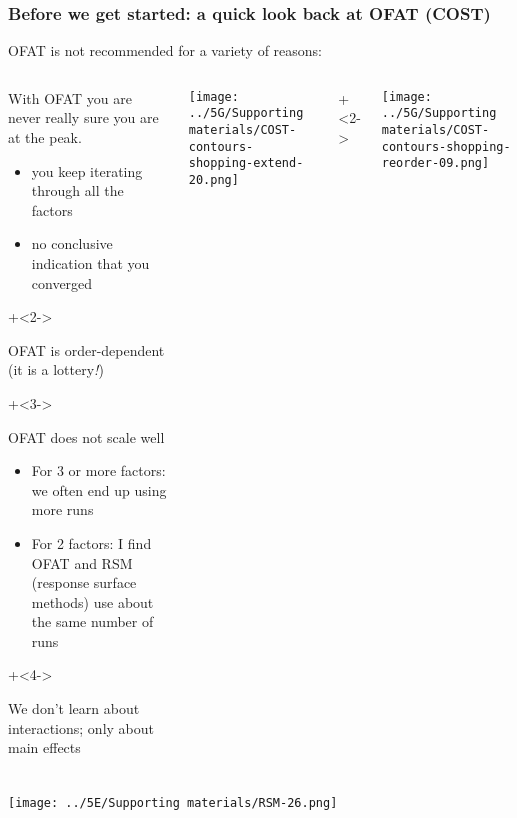 \begin{frame}\frametitle{Before we get started: a quick look back at OFAT (COST)}
	
	OFAT is not recommended for a variety of reasons:
	\begin{columns}[T]
			\vspace{0.5cm}
			\begin{itemize}
				\item	With OFAT you are never really sure you are at the peak.
					\begin{itemize}
						\item	you keep iterating through all the factors
						\item	no conclusive indication that you converged
					\end{itemize}
				
		\onslide+<2->{
				\vspace{0.5cm}
				\item	OFAT is order-dependent (it is a lottery\emph{!})
		}
		\onslide+<3->{
				\vspace{0.5cm}
		
				\item	OFAT does not scale well 
					\begin{itemize}
						\item	For 3 or more factors: we often end up using more runs
						\item	For 2 factors: I find OFAT and RSM (response surface methods) use about the same number of
								runs
					\end{itemize}
		}
		\onslide+<4->{
				\vspace{0.5cm}
		
				\item	We don't learn about interactions; only about  main effects 
		}
			\end{itemize}
		
			\centerline{\texttt{[image: ../5G/Supporting materials/COST-contours-shopping-extend-20.png]}}
			\onslide+<2->{
				\centerline{\texttt{[image: ../5G/Supporting materials/COST-contours-shopping-reorder-09.png]}}
			}

	\end{columns}
	
	

\end{frame}
\begin{frame}\frametitle{}
	\centerline{\texttt{[image: ../5E/Supporting materials/RSM-26.png]}}
\end{frame}
